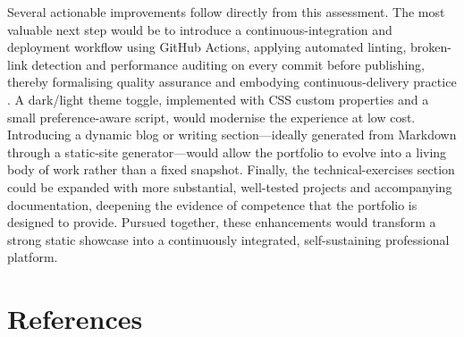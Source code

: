 \documentclass[11pt,a4paper]{article}
\begin{document}
Several actionable improvements follow directly from this assessment. The most valuable next step would be to introduce a continuous-integration and deployment workflow using GitHub Actions, applying automated linting, broken-link detection and performance auditing on every commit before publishing, thereby formalising quality assurance and embodying continuous-delivery practice \citep{humble2010,fowler2006}. A dark/light theme toggle, implemented with CSS custom properties and a small preference-aware script, would modernise the experience at low cost. Introducing a dynamic blog or writing section---ideally generated from Markdown through a static-site generator---would allow the portfolio to evolve into a living body of work rather than a fixed snapshot. Finally, the technical-exercises section could be expanded with more substantial, well-tested projects and accompanying documentation, deepening the evidence of competence that the portfolio is designed to provide. Pursued together, these enhancements would transform a strong static showcase into a continuously integrated, self-sustaining professional platform.

\section{References}
\renewcommand{\refname}{\vspace{-1.2em}}


\end{document}
